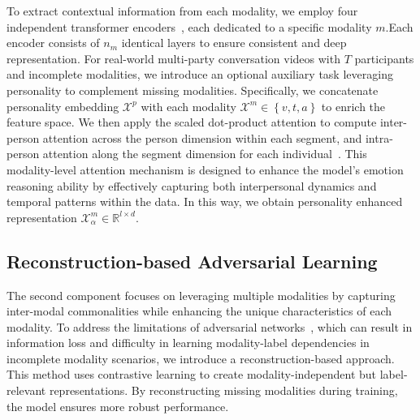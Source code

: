  To extract contextual information from each modality, we employ four independent transformer encoders~\cite{transformer}, each dedicated to a specific modality $m$.Each encoder consists of $n_m$ identical layers to ensure consistent and deep representation. For real-world multi-party conversation videos with $T$ participants and incomplete modalities, we introduce an optional auxiliary task leveraging personality to complement missing modalities. 
 Specifically, we concatenate personality embedding $\bm{\mathcal X}^{p}$ with each modality $\bm{\mathcal X}^{m} \in \left\{v,t,a \right\}$ to enrich the feature space. We then apply the scaled dot-product attention to compute inter-person attention across the person dimension within each segment, and intra-person attention along the segment dimension for each individual~\cite{MEmoR}. This modality-level attention mechanism is designed to enhance the model's emotion reasoning ability by effectively capturing both interpersonal dynamics and temporal patterns within the data.
In this way, we obtain personality enhanced representation $\bm{\mathcal X}_{\alpha}^{m} \in \mathbb{R}^{l\times d}$.

\subsection{Reconstruction-based Adversarial Learning}
\label{Reconstruction_based_Adversarial}

The second component focuses on leveraging multiple modalities by capturing inter-modal commonalities while enhancing the unique characteristics of each modality. To address the limitations of adversarial networks~\cite{GAN,Tailor}, which can result in information loss and difficulty in learning modality-label dependencies in incomplete modality scenarios, we introduce a reconstruction-based approach. This method uses contrastive learning to create modality-independent but label-relevant representations. By reconstructing missing modalities during training, the model ensures more robust performance.


